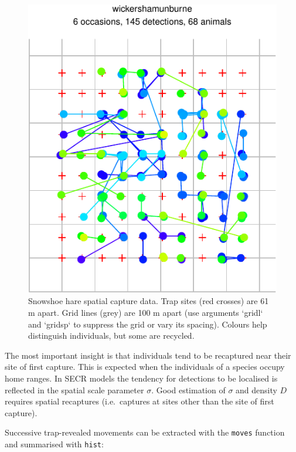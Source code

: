 \documentclass[
]{book}
\begin{document}
\begin{figure}

{\centering \includegraphics{SECRbook_files/figure-latex/cap-1} 

}

\caption{Snowshoe hare spatial capture data. Trap sites (red crosses) are 61 m apart. Grid lines (grey) are 100 m apart (use arguments `gridl` and `gridsp` to suppress the grid or vary its spacing). Colours help distinguish individuals, but some are recycled.}\label{fig:cap}
\end{figure}

The most important insight is that individuals tend to be recaptured near their site of first capture. This is expected when the individuals of a species occupy home ranges. In SECR models the tendency for detections to be localised is reflected in the spatial scale parameter \(\sigma\). Good estimation of \(\sigma\) and density \(D\) requires spatial recaptures (i.e.~captures at sites other than the site of first capture).

Successive trap-revealed movements can be extracted with the \texttt{moves} function and summarised with \texttt{hist}:
\end{document}
